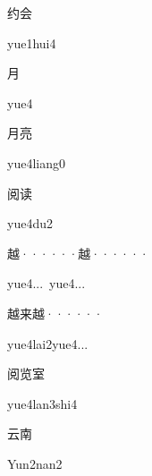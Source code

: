 \begin{verbete}{约会}
\begin{pronuncia}{yue1hui4}
\end{pronuncia}
\end{verbete}

\begin{verbete}[yue4]{月}
\begin{pronuncia}{yue4}
\end{pronuncia}
\end{verbete}

\begin{verbete}{月亮}
\begin{pronuncia}{yue4liang0}
\end{pronuncia}
\end{verbete}

\begin{verbete}[yue4du2]{阅读}
\begin{pronuncia}{yue4du2}
\end{pronuncia}
\end{verbete}

\begin{verbete}{越······越······}
\begin{pronuncia}{yue4...\ yue4...}
\end{pronuncia}
\end{verbete}

\begin{verbete}{越来越······}
\begin{pronuncia}{yue4lai2yue4...}
\end{pronuncia}
\end{verbete}

\begin{verbete}{阅览室}
\begin{pronuncia}{yue4lan3shi4}
\end{pronuncia}
\end{verbete}

\begin{verbete}{云南}
\begin{pronuncia}{Yun2nan2}
\end{pronuncia}
\end{verbete}

